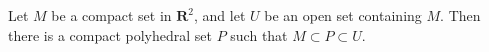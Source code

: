 Let $M$ be a compact set in $\mathbf{R}^2$, and let $U$ be an open set containing $M$. Then there is a compact polyhedral set $P$ such that $M \subset P \subset U$.
